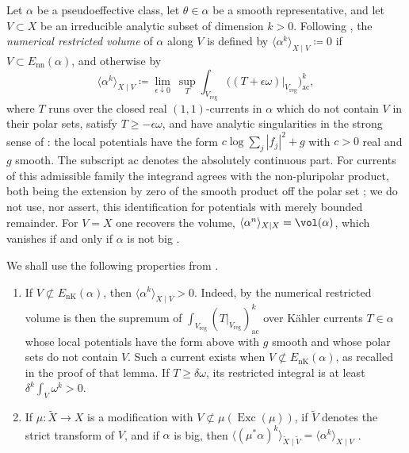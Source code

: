 Let $\alpha$ be a pseudoeffective class, let $\theta\in\alpha$ be a
smooth representative, and let $V\subset X$ be an irreducible analytic
subset of dimension $k>0$. Following \cite[Section~2]{CT22Restricted}, the
\emph{numerical restricted volume} of $\alpha$ along $V$ is defined by
$\langle\alpha^k\rangle_{X\mid V}\coloneqq 0$ if $V\subset{E_{\mathrm{nn}}}(\alpha)$, and
otherwise by
\begin{equation}\label{nk:eq:def-restricted-volume}
  \langle\alpha^k\rangle_{X\mid V}
  \coloneqq \lim_{\epsilon\downarrow0}\ \sup_{T}
     \int_{V_{\mathrm{reg}}}
     \bigl((T+\epsilon\omega)|_{V_{\mathrm{reg}}}\bigr)_{\mathrm{ac}}^k,
\end{equation}
where $T$ runs over the closed real $(1,1)$-currents in $\alpha$
which do not contain $V$ in their polar sets, satisfy
$T\ge-\epsilon\omega$, and have analytic singularities in the strong
sense of \cite[Section~2]{CT22Restricted}: the local potentials have the form
$c\log\sum_j|f_j|^2+g$ with $c>0$ real and $g$ smooth. The
subscript $\mathrm{ac}$ denotes the absolutely continuous part. For
currents of this admissible family the integrand agrees with the
non-pluripolar product, both being the extension by zero of the smooth
product off the polar set \cite[Remark~2.2]{CT22Restricted}; we do not use, nor
assert, this identification for potentials with merely bounded
remainder. For $V=X$ one recovers the volume,
$\langle\alpha^n\rangle_{X\mid X}=\vol(\alpha)$, which vanishes if and
only if $\alpha$ is not big \cite{Bou02b}.

We shall use the following properties from \cite{CT22Restricted}.
\begin{enumerate}[label=(\alph*),leftmargin=*,itemsep=.2em,topsep=.3em]
\item\label{nk:it:rv-positive} If $V\not\subset{E_{\mathrm{nK}}}(\alpha)$, then
  $\langle\alpha^k\rangle_{X\mid V}>0$. Indeed, by
  \cite[Lemma~2.7]{CT22Restricted} the numerical restricted volume is then the
  supremum of
  $\int_{V_{\mathrm{reg}}}(T|_{V_{\mathrm{reg}}})_{\mathrm{ac}}^k$
  over K\"ahler currents $T\in\alpha$ whose local potentials have
  the form above with $g$ smooth and whose polar sets do not contain
  $V$. Such a current exists when $V\not\subset{E_{\mathrm{nK}}}(\alpha)$,
  as recalled in the proof of that lemma. If $T\ge\delta\omega$,
  its restricted integral is at least $\delta^k\int_V\omega^k>0$.
\item\label{nk:it:rv-birational} If $\mu\colon\widetilde X\to X$ is a
  modification with $V\not\subset\mu(\operatorname{Exc}(\mu))$, if
  $\widetilde V$ denotes the strict transform of $V$, and if
  $\alpha$ is big, then
  $\langle(\mu^*\alpha)^k\rangle_{\widetilde X\mid\widetilde V}
  =\langle\alpha^k\rangle_{X\mid V}$ \cite[Lemma~4.2]{CT22Restricted}.
\end{enumerate}

